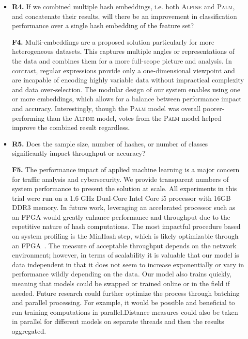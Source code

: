\begin{itemize}
\item\textbf{R4.} If we combined multiple hash embeddings, i.e. both \textsc{Alpine} and \textsc{Palm}, and concatenate their results, will there be an improvement in classification performance over a single hash embedding of the feature set?

\textbf{F4.} Multi-embeddings are a proposed solution particularly for more heterogeneous datasets. This captures multiple angles or representations of the data and combines them for a more full-scope picture and analysis. In contrast, regular expressions provide only a one-dimensional viewpoint and are incapable of encoding highly variable data without impractical complexity and data over-selection. The modular design of our system enables using one or more embeddings, which allows for a balance between performance impact and accuracy. Interestingly, though the \textsc{Palm} model was overall poorer-performing than the \textsc{Alpine} model, votes from the \textsc{Palm} model helped improve the combined result regardless.

\item\textbf{R5.} Does the sample size, number of hashes, or number of classes significantly impact throughput or accuracy?

\textbf{F5.} The performance impact of applied machine learning is a major concern for traffic analysis and cybersecurity. We provide transparent numbers of system performance to present the solution at scale. All experiments in this trial were run on a 1.6 GHz Dual-Core Intel Core i5 processor with 16GB DDR3 memory. In future work, leveraging an accelerated processor such as an FPGA would greatly enhance performance and throughput due to the repetitive nature of hash computations. The most impactful procedure based on system profiling is the MinHash step, which is likely optimizable through an FPGA~\cite{fpga}. The measure of acceptable throughput depends on the network environment; however, in terms of scalability it is valuable that our model is data independent in that it does not seem to increase exponentially or vary in performance wildly depending on the data. Our model also trains quickly, meaning that models could be swapped or trained online or in the field if needed. Future research could further optimize the process through batching and parallel processing. For example, it would be possible and beneficial to run training computations in parallel.Distance measures could also be taken in parallel for different models on separate threads and then the results aggregated.


\end{itemize}
